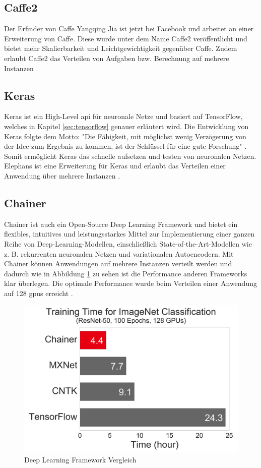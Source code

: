 \subsection{Caffe2}
Der Erfinder von Caffe Yangqing Jia ist jetzt bei Facebook und arbeitet an einer Erweiterung von Caffe. Diese wurde unter dem Name Caffe2 veröffentlicht und bietet mehr Skalierbarkeit und Leichtgewichtigkeit gegenüber Caffe. Zudem erlaubt Caffe2 das Verteilen von Aufgaben bzw. Berechnung auf mehrere Instanzen \cite{Caffe2}.

\subsection{Keras}
Keras ist ein High-Level \ac{api} für neuronale Netze und basiert auf TensorFlow, welches in Kapitel \ref{sec:tensorflow} genauer erläutert wird. Die Entwicklung von Keras folgte dem Motto: "Die Fähigkeit, mit möglichst wenig Verzögerung von der Idee zum Ergebnis zu kommen, ist der Schlüssel für eine gute Forschung" \cite{Keras}. Somit ermöglicht Keras das schnelle aufsetzen und testen von neuronalen Netzen. Elephans ist eine Erweiterung für Keras und erlaubt das Verteilen einer Anwendung über mehrere Instanzen \cite{Elephas}.

\subsection{Chainer}
Chainer ist auch ein Open-Source Deep Learning Framework und bietet ein flexibles, intuitives und leistungsstarkes Mittel zur Implementierung einer ganzen Reihe von Deep-Learning-Modellen, einschließlich State-of-the-Art-Modellen wie z. B. rekurrenten neuronalen Netzen und variationalen Autoencodern. Mit Chainer können Anwendungen auf mehrere Instanzen verteilt werden und dadurch wie in Abbildung \ref{fig:chainercomparisson} zu sehen ist die Performance anderen Frameworks klar überlegen. Die optimale Performance wurde beim Verteilen einer Anwendung auf 128 \ac{gpu}s erreicht \cite{Chainer}.

\begin{figure}[h!]
	\centering
	\includegraphics[width=0.9\linewidth]{Pictures/Chainer_Comparisson}
	\caption[Deep Learning Framework Vergleich]{Deep Learning Framework Vergleich \cite{Chainer}}
	\label{fig:chainercomparisson}
\end{figure}

